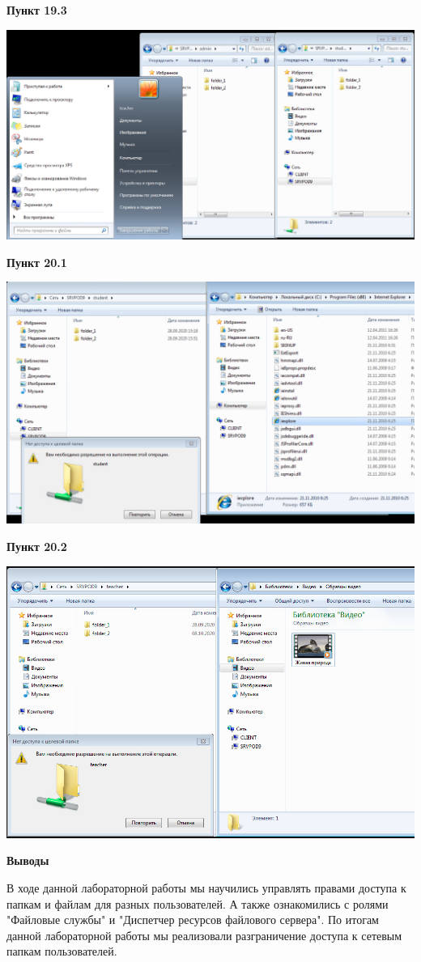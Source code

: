 \documentclass[a4paper,14pt]{extarticle}
\begin{document}
    \textbf{Пункт 19.3}
    \begin{center}
        \includegraphics[scale=0.5]{19.3}
    \end{center}
    \newpage
    \textbf{Пункт 20.1}
    \begin{center}
        \includegraphics[scale=0.5]{20.1}
    \end{center}
    \textbf{Пункт 20.2}
    \begin{center}
        \includegraphics[scale=0.6]{20.2}
    \end{center}
    \newpage
    \textbf{Выводы}

    В ходе данной лабораторной работы мы научились управлять правами доступа 
    к папкам и файлам для разных пользователей. А также ознакомились с ролями
    "Файловые службы" и "Диспетчер ресурсов файлового сервера". По итогам данной
    лабораторной работы мы реализовали разграничение доступа к сетевым папкам
    пользователей.

   
\end{document}
